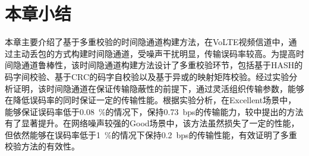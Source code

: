 \section{本章小结}
\label{chap:hash:summary}

本章主要介绍了基于多重校验的时间隐通道构建方法，在VoLTE视频信道中，通过主动丢包的方式构建时间隐通道，受噪声干扰明显，传输误码率较高。为提高时间隐通道鲁棒性，该时间隐通道构建方法设计了多重校验环节，包括基于HASH的码字间校验、基于CRC的码字自校验以及基于异或的映射矩阵校验。经过实验分析证明，该时间隐通道在保证传输隐蔽性的前提下，通过灵活组织传输参数，能够在降低误码率的同时保证一定的传输性能。根据实验分析，在Excellent场景中，能够保证误码率低于0.08\ \%的情况下，保持0.73\ bps的传输能力，较中提出的方法有了显著提升。在网络噪声较强的Good场景中，该方法虽然损失了一定的性能，但依然能够在误码率低于1\ \%的情况下保持0.2\ bps的传输性能，有效证明了多重校验方法的有效性。
